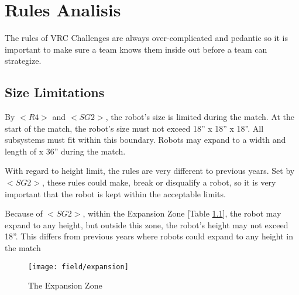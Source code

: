 \documentclass[../main.tex]{subfiles}
\begin{document}
\chapter{Rules Analisis}

The rules of VRC Challenges are always over-complicated and pedantic
so it is important to make sure a team knows them inside out before a team can
strategize.

\section{Size Limitations}

By $<R4>$ and $<SG2>$, the robot’s size is limited during the match. 
At the start of the match, the robot’s size must not exceed 18” x 18” x 18”. 
All subsystems must fit within this boundary.
Robots may expand to a width and length of  x 36” during the match. \par

With regard to height limit, the rules are very different to previous years.
Set by $<SG2>$, these rules could make, break or disqualify a robot,
so it is very important that the robot is kept within the acceptable limits. \par

Because of $<SG2>$, within the Expansion Zone [Table \ref{fig:expansionzone}], the robot may expand to any height,
but outside this zone, the robot’s height may not exceed 18”.
This differs from previous years where robots could expand to any height in the match 
\par

\begin{figure}
    \texttt{[image: field/expansion]}
    \caption{The Expansion Zone}
   \label{fig:expansionzone}
\end{figure}
\end{document}
